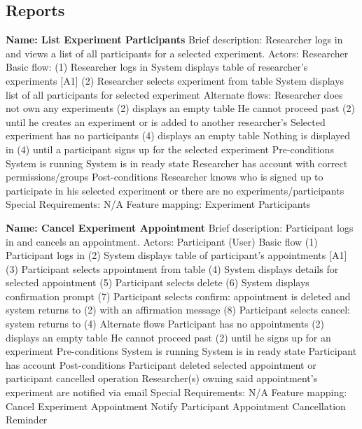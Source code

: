 \subsection{Reports}
\begin{outline}[enumerate]

\1 {\bf Name: List Experiment Participants}
\2 Brief description: Researcher logs in and views a list of all participants for a selected experiment.
\2 Actors: Researcher
\2 Basic flow:
\3 (1) Researcher logs in
\3 System displays table of researcher's experiments [A1]
\3 (2) Researcher selects experiment from table
\3 System displays list of all participants for selected experiment
\2 Alternate flows:
\3 [A1] Researcher does not own any experiments
\4 (2) displays an empty table
\4 He cannot proceed past (2) until he creates an experiment or is added to another researcher's
\3 Selected experiment has no participants
\4 (4) displays an empty table
\4 Nothing is displayed in (4) until a participant signs up for the selected experiment
\2 Pre-conditions
\3 System is running
\3 System is in ready state
\3 Researcher has account with correct permissions/groups
\2 Post-conditions
\3 Researcher knows who is signed up to participate in his selected experiment or there are no experiments/participants
\2 Special Requirements:
\3 N/A
\2 Feature mapping:
\3 Experiment Participants

\1 {\bf Name: Cancel Experiment Appointment}
\2 Brief description: Participant logs in and cancels an appointment.
\2 Actors: Participant (User)
\2 Basic flow
\3 (1) Participant logs in
\3 (2) System displays table of participant's appointments [A1]
\3 (3) Participant selects appointment from table
\3 (4) System displays details for selected appointment
\3 (5) Participant selects delete
\3 (6) System displays confirmation prompt
\3 (7) Participant selects confirm: appointment is deleted and system returns to (2) with an affirmation message
\3 (8) Participant selects cancel: system returns to (4)
\2 Alternate flows
\3 [A1] Participant has no appointments
\4 (2) displays an empty table
\4 He cannot proceed past (2) until he signs up for an experiment
\2 Pre-conditions
\3 System is running
\3 System is in ready state
\3 Participant has account
\2 Post-conditions
\3 Participant deleted selected appointment or participant cancelled operation
\3 Researcher(s) owning said appointment's experiment are notified via email
\2 Special Requirements:
\3 N/A
\2 Feature mapping:
\3 Cancel Experiment Appointment
\3 Notify Participant Appointment Cancellation Reminder


\end{outline}
